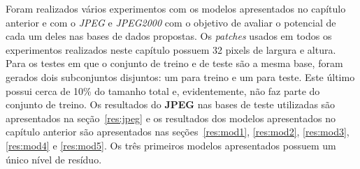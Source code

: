 Foram realizados vários experimentos com os modelos apresentados no capítulo anterior e com o \textit{JPEG} e \textit{JPEG2000} com o objetivo de avaliar o potencial de cada um deles nas bases de dados propostas. Os \textit{patches} usados em todos os experimentos realizados neste capítulo possuem 32 pixels de largura e altura. Para os testes em que o conjunto de treino e de teste são a mesma base, foram gerados dois subconjuntos disjuntos: um para treino e um para teste. Este último possui cerca de 10\% do tamanho total e, evidentemente, não faz parte do conjunto de treino. Os resultados do \textbf{JPEG} nas bases de teste utilizadas são apresentados na seção~\ref{res:jpeg} e os resultados dos modelos apresentados no capítulo anterior são apresentados nas seções~\ref{res:mod1}, \ref{res:mod2}, \ref{res:mod3}, \ref{res:mod4} e \ref{res:mod5}. Os três primeiros modelos apresentados possuem um único nível de resíduo.
